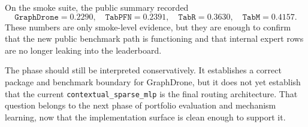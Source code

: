 On the smoke suite, the public summary recorded
\[
\texttt{GraphDrone}=0.2290,\quad
\texttt{TabPFN}=0.2391,\quad
\texttt{TabR}=0.3630,\quad
\texttt{TabM}=0.4157.
\]
These numbers are only smoke-level evidence, but they are enough to confirm that the new public benchmark path is functioning and that internal expert rows are no longer leaking into the leaderboard.

The phase should still be interpreted conservatively. It establishes a correct package and benchmark boundary for GraphDrone, but it does not yet establish that the current \texttt{contextual\_sparse\_mlp} is the final routing architecture. That question belongs to the next phase of portfolio evaluation and mechanism learning, now that the implementation surface is clean enough to support it.
